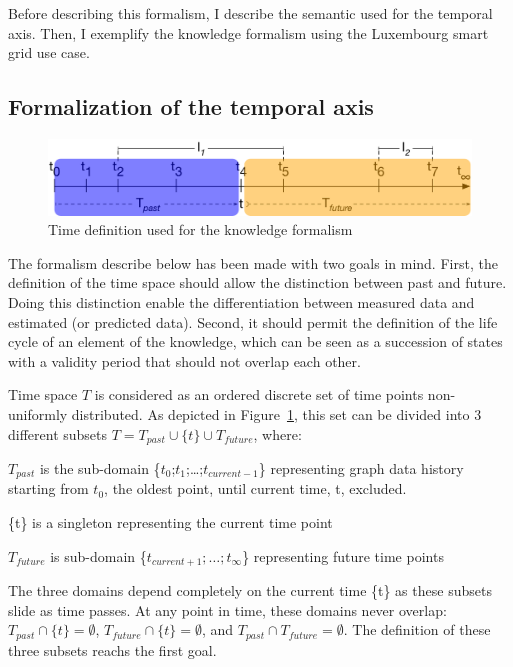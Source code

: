 Before describing this formalism, I describe the semantic used for the temporal axis.
Then, I exemplify the knowledge formalism using the Luxembourg smart grid use case.

\subsection{Formalization of the temporal axis}
\label{sec:tkm:timeDef}

\begin{figure}
   \centering
	\includegraphics[width=\textwidth]{img/chapt-tkm/formalism/formalismeTime}
	\caption{Time definition used for the knowledge formalism}
	\label{fig:tkm:formalismeTime}
\end{figure}

The formalism describe below has been made with two goals in mind.
First, the definition of the time space should allow the distinction between past and future. 
Doing this distinction enable the differentiation between measured data and estimated (or predicted data).
Second, it should permit the definition of the life cycle of an element of the \gls{knowledge}, which can be seen as a succession of states with a validity period that should not overlap each other.

Time space $T$ is considered as an ordered discrete set of time points non-uniformly distributed. 
As depicted in Figure~\ref{fig:tkm:formalismeTime}, this set can be divided into 3 different subsets $T = T_{past} \cup \{t\} \cup T_{future}$, where:  
\begin{condItemize}
	\item $T_{past}$ is the sub-domain \{$t_{0}$;$t_{1}$;\ldots;$t_{current-1}$\}  representing graph data history starting from $t_0$, the oldest point, until current time, t, excluded.
	\item \{t\} is a singleton representing the current time 
point
	\item $T_{future}$ is sub-domain \{$t_{current+1};\ldots;t_{\infty}$\} representing future time points 
\end{condItemize}
The three domains depend completely on the current time \{t\} as these subsets slide as time passes. 
At any point in time, these domains never overlap: $T_{past} \cap \{t\} = \emptyset$, $T_{future} \cap \{t\} =  \emptyset$, and $T_{past} \cap T_{future} = \emptyset$.
The definition of these three subsets reachs the first goal.


